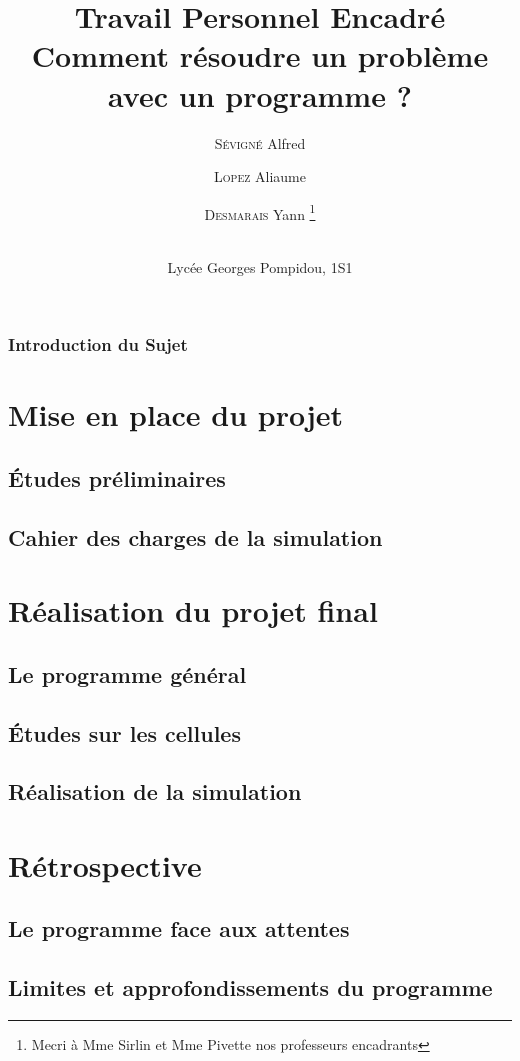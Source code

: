 \documentclass[a4paper,15pt]{report}
\title{
Travail Personnel Encadré \\
Comment résoudre un problème avec un programme ?
}
\author{
  \textsc{Sévigné} Alfred \and 
  \textsc{Lopez} Aliaume \and 
  \textsc{Desmarais} Yann
  \thanks{
     Mecri à Mme Sirlin et Mme Pivette nos professeurs encadrants
  } \and  \\
  Lycée Georges Pompidou, 1S1
}
\begin{document}
\maketitle

\section*{Introduction du Sujet}
  
  
\tableofcontents

\part{Mise en place du projet}
  \chapter{Études préliminaires}
 	  
  \chapter{Cahier des charges de la simulation}
    
     
\part{Réalisation du projet final}
  \chapter{Le programme général}
    
  \chapter{Études sur les cellules}
	
  \chapter{Réalisation de la simulation}
     
\part{Rétrospective}
  \chapter{Le programme face aux attentes}
    
  \chapter{Limites et approfondissements du programme}
     
\end{document}
